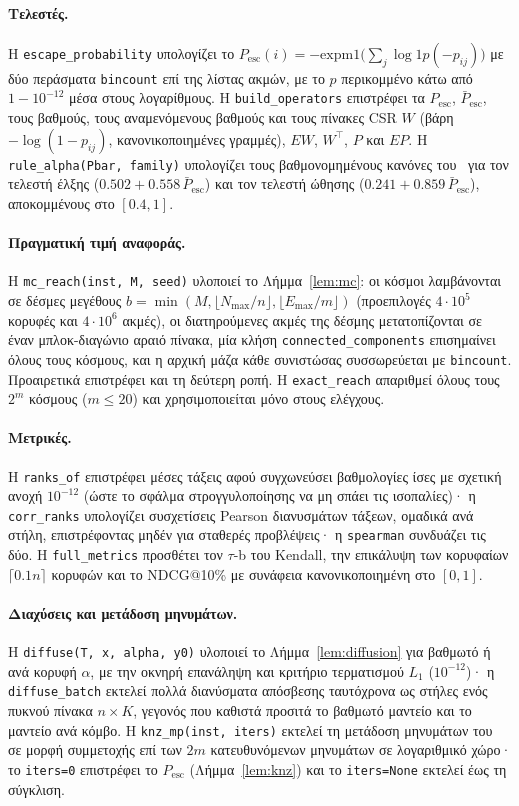 \documentclass[11pt,a4paper]{article}
\theoremstyle{definition}
\theoremstyle{plain}
\newcommand{\Pesc}{P_{\mathrm{esc}}}
\newcommand{\Pescbar}{\bar{P}_{\mathrm{esc}}}
\begin{document}
\paragraph{Τελεστές.} Η \texttt{escape\_probability} υπολογίζει το $\Pesc(i)=-\mathrm{expm1}\big(\sum_j\log1p(-p_{ij})\big)$ με δύο περάσματα \texttt{bincount} επί της λίστας ακμών, με το $p$ περικομμένο κάτω από $1-10^{-12}$ μέσα στους λογαρίθμους. Η \texttt{build\_operators} επιστρέφει τα $\Pesc$, $\Pescbar$, τους βαθμούς, τους αναμενόμενους βαθμούς και τους πίνακες CSR $W$ (βάρη $-\log(1-p_{ij})$, κανονικοποιημένες γραμμές), $EW$, $W^{\top}$, $P$ και $EP$. Η \texttt{rule\_alpha(Pbar, family)} υπολογίζει τους βαθμονομημένους κανόνες του~\cite{konstantellos26} για τον τελεστή έλξης ($0.502+0.558\,\Pescbar$) και τον τελεστή ώθησης ($0.241+0.859\,\Pescbar$), αποκομμένους στο $[0.4,1]$.

\paragraph{Πραγματική τιμή αναφοράς.} Η \texttt{mc\_reach(inst, M, seed)} υλοποιεί το Λήμμα~\ref{lem:mc}: οι κόσμοι λαμβάνονται σε δέσμες μεγέθους $b=\min(M,\lfloor N_{\max}/n\rfloor,\lfloor E_{\max}/m\rfloor)$ (προεπιλογές $4\cdot10^5$ κορυφές και $4\cdot10^6$ ακμές), οι διατηρούμενες ακμές της δέσμης μετατοπίζονται σε έναν μπλοκ-διαγώνιο αραιό πίνακα, μία κλήση \texttt{connected\_components} επισημαίνει όλους τους κόσμους, και η αρχική μάζα κάθε συνιστώσας συσσωρεύεται με \texttt{bincount}. Προαιρετικά επιστρέφει και τη δεύτερη ροπή. Η \texttt{exact\_reach} απαριθμεί όλους τους $2^m$ κόσμους ($m\le20$) και χρησιμοποιείται μόνο στους ελέγχους.

\paragraph{Μετρικές.} Η \texttt{ranks\_of} επιστρέφει μέσες τάξεις αφού συγχωνεύσει βαθμολογίες ίσες με σχετική ανοχή $10^{-12}$ (ώστε το σφάλμα στρογγυλοποίησης να μη σπάει τις ισοπαλίες)· η \texttt{corr\_ranks} υπολογίζει συσχετίσεις Pearson διανυσμάτων τάξεων, ομαδικά ανά στήλη, επιστρέφοντας μηδέν για σταθερές προβλέψεις· η \texttt{spearman} συνδυάζει τις δύο. Η \texttt{full\_metrics} προσθέτει τον $\tau$-b του Kendall, την επικάλυψη των κορυφαίων $\lceil0.1n\rceil$ κορυφών και το NDCG@10\% με συνάφεια κανονικοποιημένη στο $[0,1]$.

\paragraph{Διαχύσεις και μετάδοση μηνυμάτων.} Η \texttt{diffuse(T, x, alpha, y0)} υλοποιεί το Λήμμα~\ref{lem:diffusion} για βαθμωτό ή ανά κορυφή $\alpha$, με την οκνηρή επανάληψη και κριτήριο τερματισμού $L_1$ ($10^{-12}$)· η \texttt{diffuse\_batch} εκτελεί πολλά διανύσματα απόσβεσης ταυτόχρονα ως στήλες ενός πυκνού πίνακα $n\times K$, γεγονός που καθιστά προσιτά το βαθμωτό μαντείο και το μαντείο ανά κόμβο. Η \texttt{knz\_mp(inst, iters)} εκτελεί τη μετάδοση μηνυμάτων του~\cite{knz14} σε μορφή συμμετοχής επί των $2m$ κατευθυνόμενων μηνυμάτων σε λογαριθμικό χώρο· το \texttt{iters=0} επιστρέφει το $\Pesc$ (Λήμμα~\ref{lem:knz}) και το \texttt{iters=None} εκτελεί έως τη σύγκλιση.
\end{document}
